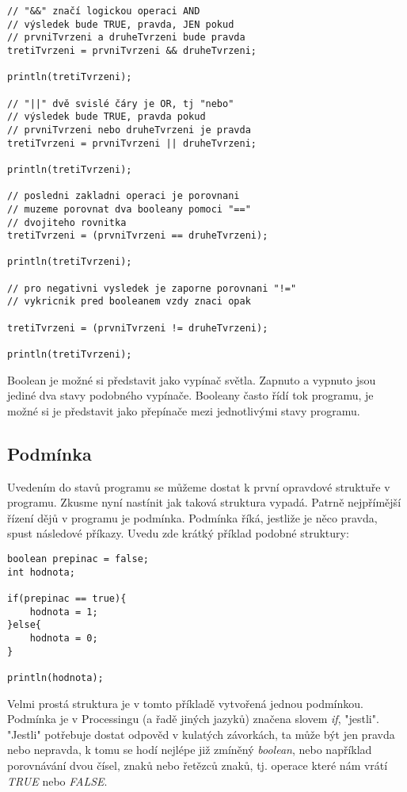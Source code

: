 \documentclass[11pt]{article} %
\begin{document}
\begin{itemize}
\begin{verbatim}
// "&&" značí logickou operaci AND
// výsledek bude TRUE, pravda, JEN pokud
// prvniTvrzeni a druheTvrzeni bude pravda
tretiTvrzeni = prvniTvrzeni && druheTvrzeni;

println(tretiTvrzeni);

// "||" dvě svislé čáry je OR, tj "nebo"
// výsledek bude TRUE, pravda pokud
// prvniTvrzeni nebo druheTvrzeni je pravda
tretiTvrzeni = prvniTvrzeni || druheTvrzeni;

println(tretiTvrzeni);

// posledni zakladni operaci je porovnani
// muzeme porovnat dva booleany pomoci "=="
// dvojiteho rovnitka
tretiTvrzeni = (prvniTvrzeni == druheTvrzeni);

println(tretiTvrzeni);

// pro negativni vysledek je zaporne porovnani "!="
// vykricnik pred booleanem vzdy znaci opak

tretiTvrzeni = (prvniTvrzeni != druheTvrzeni);

println(tretiTvrzeni);

\end{verbatim}

Boolean je možné si představit jako vypínač světla. Zapnuto a vypnuto jsou jediné dva stavy podobného vypínače. Booleany často řídí tok programu, je možné si je představit jako přepínače mezi jednotlivými stavy programu.

\end{itemize}

\subsection{Podmínka}

Uvedením do stavů programu se můžeme dostat k první opravdové struktuře v programu. Zkusme nyní nastínit jak taková struktura vypadá. Patrně nejpřímější řízení dějů v programu je podmínka. Podmínka říká, jestliže je něco pravda, spust následové příkazy. Uvedu zde krátký příklad podobné struktury:

\begin{verbatim}
boolean prepinac = false;
int hodnota;

if(prepinac == true){
    hodnota = 1;
}else{
    hodnota = 0;
}

println(hodnota);

\end{verbatim}

Velmi prostá struktura je v tomto příkladě vytvořená jednou podmínkou. Podmínka je v Processingu (a řadě jiných jazyků) značena slovem {\em if}, "jestli". "Jestli" potřebuje dostat odpověd v kulatých závorkách, ta může být jen pravda nebo nepravda, k tomu se hodí nejlépe již zmíněný {\em boolean}, nebo například porovnávání dvou čísel, znaků nebo řetězců znaků, tj. operace které nám vrátí {\em TRUE} nebo {\em FALSE}.
\end{document}
